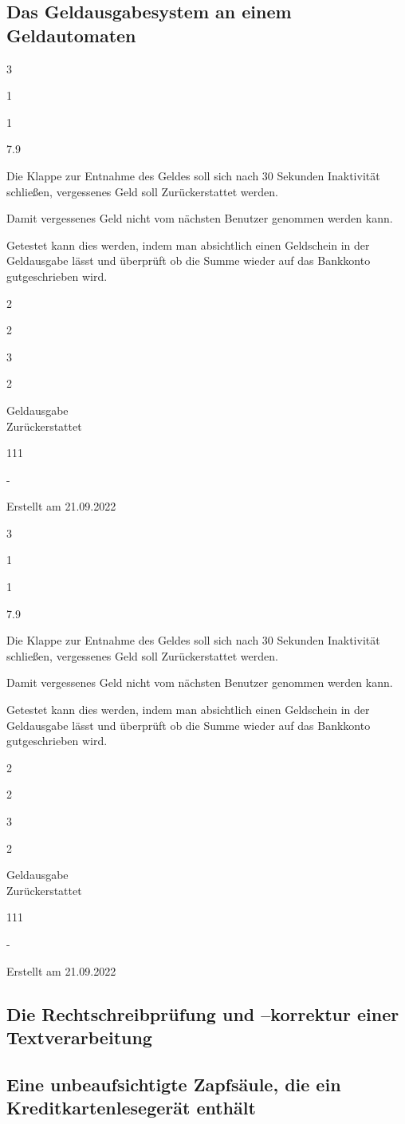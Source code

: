 \documentclass[12pt]{article}
\newenvironment{myreq}[1]{%
\setlist[description]{font=\normalfont\color{darkgray}}%
\begin{tcolorbox}[colframe=black,colback=white, sharp corners, boxrule=1pt]%
\bfseries\color{blue}%
\begin{description}#1}%
{\end{description}\end{tcolorbox}}
\newcommand{\threeinline}[3]{\begin{multicols}{3}#1 #2 #3\end{multicols}}
\newcommand{\twoinline}[2]{\begin{multicols}{2}#1 #2\end{multicols}}
\newcommand{\reqno}{\item[Requirement \#:]}
\newcommand{\reqtype}{\item[Requirement Type:]}
\newcommand{\reqevent}{\item[Event/BUC/PUC \#:]}
\newcommand{\reqdesc}{\item[Description:]}
\newcommand{\reqrat}{\item[Rationale:]}
\newcommand{\reqfit}{\item[Fit Criterion:]}
\newcommand{\reqsatis}{\item[Customer Satisfaction:]}
\newcommand{\reqdissat}{\item[Customer Dissatisfaction:]}
\newcommand{\reqdep}{\item[Dependencies:]}
\newcommand{\reqconf}{\item[Conflicts:]}
\newcommand{\reqmater}{\item[Materials:]}
\newcommand{\reqhist}{\item[History:]}
\begin{document}
\subsection{Das Geldausgabesystem an einem Geldautomaten}
\begin{myreq}
  \threeinline
    {\reqno 1}
    {\reqtype 1}
    {\reqevent 7.9}
  \reqdesc Die Klappe zur Entnahme des Geldes soll sich nach 30 Sekunden Inaktivität schließen, vergessenes Geld soll Zurückerstattet werden.
  \reqrat Damit vergessenes Geld nicht vom nächsten Benutzer genommen werden kann.
  \reqfit Getestet kann dies werden, indem man absichtlich einen Geldschein in der Geldausgabe lässt und überprüft ob die Summe wieder auf das Bankkonto gutgeschrieben wird.
  \twoinline
    {\reqsatis 2}
    {\reqdissat 3}
  \twoinline
  {\reqdep Geldausgabe\\Zurückerstattet}
  {\reqconf 111}
  \reqmater -
  \reqhist Erstellt am 21.09.2022
\end{myreq}

\begin{myreq}
  \threeinline
    {\reqno 1}
    {\reqtype 1}
    {\reqevent 7.9}
  \reqdesc Die Klappe zur Entnahme des Geldes soll sich nach 30 Sekunden Inaktivität schließen, vergessenes Geld soll Zurückerstattet werden.
  \reqrat Damit vergessenes Geld nicht vom nächsten Benutzer genommen werden kann.
  \reqfit Getestet kann dies werden, indem man absichtlich einen Geldschein in der Geldausgabe lässt und überprüft ob die Summe wieder auf das Bankkonto gutgeschrieben wird.
  \twoinline
    {\reqsatis 2}
    {\reqdissat 3}
  \twoinline
  {\reqdep Geldausgabe\\Zurückerstattet}
  {\reqconf 111}
  \reqmater -
  \reqhist Erstellt am 21.09.2022
\end{myreq}

\subsection{Die Rechtschreibprüfung und –korrektur einer Textverarbeitung}
\subsection{Eine unbeaufsichtigte Zapfsäule, die ein Kreditkartenlesegerät enthält}
\pagebreak
\printbibliography
\end{document}
